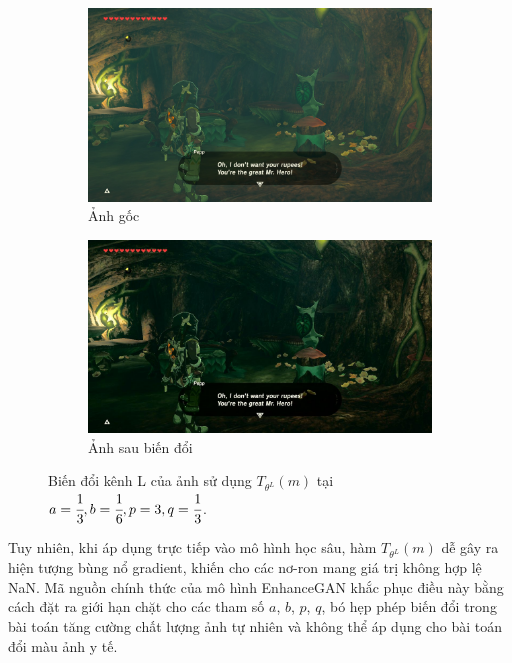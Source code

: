 \documentclass[12pt]{extreport}
\begin{document}
\begin{figure}[H]
    \centering
    \begin{subfigure}[H]{0.45\textwidth}
        \centering
        \includegraphics[width=\linewidth]{enhancegan/image.jpg}
        \caption{Ảnh gốc}
    \end{subfigure}
    \begin{subfigure}[H]{0.45\textwidth}
        \centering
        \includegraphics[width=\linewidth]{enhancegan/transformed.jpg}
        \caption{Ảnh sau biến đổi}
    \end{subfigure}
    \caption{Biến đổi kênh L của ảnh sử dụng $ T_{\theta^L}(m) $ tại $ a = \cfrac{1}{3}, b = \cfrac{1}{6}, p = 3, q = \cfrac{1}{3} $.}
\end{figure}

Tuy nhiên, khi áp dụng trực tiếp vào mô hình học sâu, hàm $ T_{\theta^L}(m) $ dễ gây ra hiện tượng bùng nổ gradient, khiến cho các nơ-ron mang giá trị không hợp lệ NaN. Mã nguồn chính thức của mô hình EnhanceGAN khắc phục điều này bằng cách đặt ra giới hạn chặt cho các tham số $ a $, $ b $, $ p $, $ q $, bó hẹp phép biến đổi trong bài toán tăng cường chất lượng ảnh tự nhiên và không thể áp dụng cho bài toán đổi màu ảnh y tế.
\end{document}
